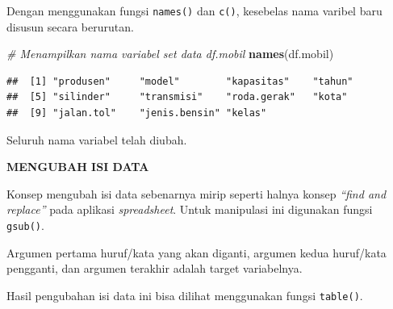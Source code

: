 \documentclass[openany]{book}
\newenvironment{Shaded}{\begin{snugshade}}{\end{snugshade}}
\newcommand{\KeywordTok}[1]{\textcolor[rgb]{0.13,0.29,0.53}{\textbf{#1}}}
\newcommand{\StringTok}[1]{\textcolor[rgb]{0.31,0.60,0.02}{#1}}
\newcommand{\CommentTok}[1]{\textcolor[rgb]{0.56,0.35,0.01}{\textit{#1}}}
\newcommand{\OperatorTok}[1]{\textcolor[rgb]{0.81,0.36,0.00}{\textbf{#1}}}
\newcommand{\NormalTok}[1]{#1}
\begin{document}
Dengan menggunakan fungsi \texttt{names()} dan \texttt{c()}, kesebelas
nama varibel baru disusun secara berurutan.

\begin{Shaded}
\begin{Highlighting}[]
\CommentTok{# Menampilkan nama variabel set data df.mobil}
\KeywordTok{names}\NormalTok{(df.mobil)}
\end{Highlighting}
\end{Shaded}

\begin{verbatim}
##  [1] "produsen"     "model"        "kapasitas"    "tahun"       
##  [5] "silinder"     "transmisi"    "roda.gerak"   "kota"        
##  [9] "jalan.tol"    "jenis.bensin" "kelas"
\end{verbatim}

Seluruh nama variabel telah diubah.

\textbf{MENGUBAH ISI DATA}

Konsep mengubah isi data sebenarnya mirip seperti halnya konsep
\emph{``find and replace''} pada aplikasi \emph{spreadsheet}. Untuk
manipulasi ini digunakan fungsi \texttt{gsub()}.

Argumen pertama huruf/kata yang akan diganti, argumen kedua huruf/kata
pengganti, dan argumen terakhir adalah target variabelnya.

\begin{Shaded}
\end{Shaded}

Hasil pengubahan isi data ini bisa dilihat menggunakan fungsi
\texttt{table()}.

\begin{Shaded}
\end{Shaded}
\end{document}
